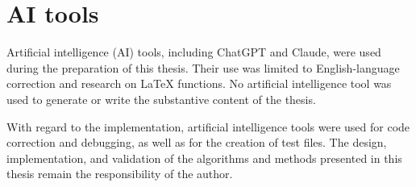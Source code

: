 \newpage

\section{AI tools}

Artificial intelligence (AI) tools, including ChatGPT and Claude, were used during the preparation of this thesis. Their use was limited to English-language correction and research on LaTeX functions. No artificial intelligence tool was used to generate or write the substantive content of the thesis.

With regard to the implementation, artificial intelligence tools were used for code correction and debugging, as well as for the creation of test files. The design, implementation, and validation of the algorithms and methods presented in this thesis remain the responsibility of the author.
